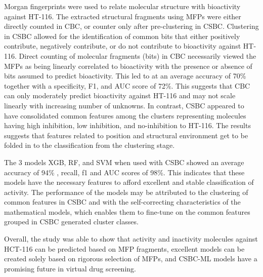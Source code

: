 Morgan fingerprints were used to relate molecular structure with bioactivity against HT-116. The extracted structural fragments using MFPs were either directly counted in CBC, or counter only after pre-clustering in CSBC. Clustering in CSBC allowed for the identification of common bits that either positively contribute, negatively contribute, or do not contribute to bioactivity against HT-116. Direct counting of molecular fragments (bits) in CBC necessarily viewed the MFPs as being linearly correlated to bioactivity with the presence or absence of bits assumed to predict bioactivity. This led to at an average accuracy of 70\% together with a specificity, F1, and AUC score of 72\%. This suggests that CBC can only moderately predict bioactivity against HT-116 and may not scale linearly with increasing number of unknowns. In contrast, CSBC appeared to have consolidated common features among the clusters representing molecules having high inhibition, low inhibition, and no-inhibition to HT-116. The results suggests that features related to position and structural environment get to be folded in to the classification from the clustering stage.

The 3 models XGB, RF, and SVM when used with CSBC showed an average accuracy of 94\% , recall, f1 and AUC scores of 98\%. This indicates that these models have the necessary features to afford excellent and stable classification of activity. The performance of the models may be attributed to the clustering of common features in CSBC and with the self-correcting characteristics of the mathematical models, which enables them to fine-tune on the common features grouped in CSBC generated cluster classes.


Overall, the study was able to show that activity and inactivity molecules against HCT-116 can be predicted based on MFP fragments, excellent models can be created solely based on rigorous selection of MFPs, and CSBC-ML models have a promising future in virtual drug screening. 

